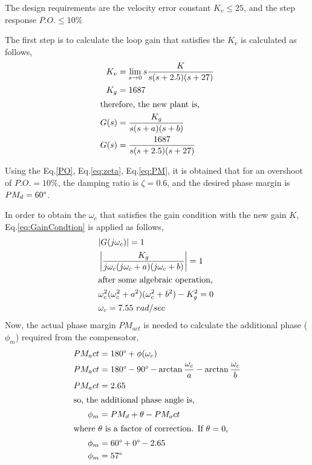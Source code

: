 \documentclass[11pt, a4paper]{article}
\begin{document}
The design requirements are the velocity error constant $K_v\leq 25$, and the step response $P.O.\leq 10\%$

The first step is to calculate the loop gain that satisfies the $K_v$ is calculated as follows,
\begin{align}
K_v &= \lim\limits_{s \rightarrow 0} s \dfrac{K}{s(s+2.5) (s+27)} \\
K_g &= 1687 \nonumber\\
\intertext{therefore, the new plant is,} 
G(s) &= \dfrac{K_g}{s(s+a)(s+b)} \\
G(s) &= \dfrac{1687}{s(s+2.5)(s+27)} \nonumber
\end{align}

Using the Eq.\eqref{PO}, Eq.\eqref{eq:zeta}, Eq.\eqref{eq:PM}, it is obtained that for an overshoot of $P.O.=10 \%$, the damping ratio is $\zeta = 0.6$, and the desired phase margin is $PM_d=60\degree$.

In order to obtain the  $\omega_c$ that satisfies the gain condition with the new gain $K$, Eq.\eqref{eq:GainCondtion} is applied as follows,
\begin{align}
&\arrowvert G(j\omega_c) \arrowvert = 1 \nonumber\\
&\left| \dfrac{K_g}{j\omega_c(j\omega_c+a)(j\omega_c+b)} \right| = 1 \nonumber\\
\intertext{after some algebraic operation, }
&\omega_c^2(\omega_c^2+a^2)(\omega_c^2+b^2)-K_g^2 = 0 \nonumber \\
&\omega_c = 7.55 ~rad/sec \nonumber
\end{align}
Now, the actual phase margin $PM_{act}$ is needed to calculate the additional phase ($\phi_m$) required from the compensator,
\begin{align}
PM_act &= 180\degree + \phi(\omega_c) \\
PM_act &= 180\degree - 90\degree -\arctan \frac{\omega_c}{a} - \arctan \frac{\omega_c}{b} \nonumber \\
PM_act &= 2.65 \nonumber\\
\intertext{so, the additional phase angle is,} 
\phi_m &= PM_d+\theta-PM_act \\
\intertext{where $\theta$ is a factor of correction. If $\theta=0$,}
\phi_m &= 60\degree + 0\degree - 2.65 \nonumber\\
\phi_m &= 57 \degree \nonumber
\end{align}
\end{document}
